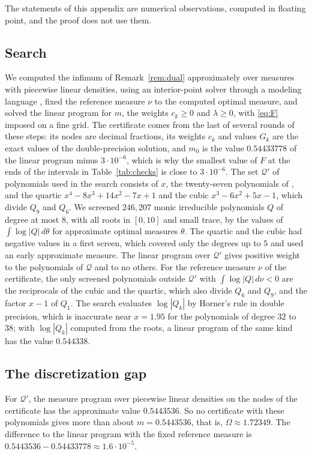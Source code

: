 \documentclass[11pt]{amsart}
\theoremstyle{remark}
\numberwithin{equation}{section}
\newcommand{\Margin}{3\cdot10^{-6}}
\newcommand{\MDual}{0.54433778}
\newcommand{\PrimalVal}{0.5443536}
\begin{document}
The statements of this appendix are numerical observations, computed in floating point, and the proof does not use them.

\subsection{Search}\label{sec:search}
We computed the infimum of Remark~\ref{rem:dual} approximately over measures with piecewise linear densities, using an interior-point solver \cite{Clarabel} through a modeling language \cite{CVXPY}, fixed the reference measure $\nu$ to the computed optimal measure, and solved the linear program for $m$, the weights $c_k\ge0$ and $\lambda\ge0$, with \eqref{eq:F} imposed on a fine grid. The certificate comes from the last of several rounds of these steps: its nodes are decimal fractions, its weights $c_k$ and values $G_k$ are the exact values of the double-precision solution, and $m_0$ is the value $\MDual$ of the linear program minus $\Margin$, which is why the smallest value of $F$ at the ends of the intervals in Table~\ref{tab:checks} is close to $3\cdot10^{-6}$. The set $\mathcal Q'$ of polynomials used in the search consists of $x$, the twenty-seven polynomials of \cite[Table~1]{Fla15}, and the quartic $x^4-8x^3+14x^2-7x+1$ and the cubic $x^3-6x^2+5x-1$, which divide $Q_9$ and $Q_6$. We screened $246{,}207$ monic irreducible polynomials $Q$ of degree at most $8$, with all roots in $[0,10]$ and small trace, by the values of $\int\log|Q|\,d\theta$ for approximate optimal measures $\theta$. The quartic and the cubic had negative values in a first screen, which covered only the degrees up to $5$ and used an early approximate measure. The linear program over $\mathcal Q'$ gives positive weight to the polynomials of $\mathcal Q$ and to no others. For the reference measure $\nu$ of the certificate, the only screened polynomials outside $\mathcal Q'$ with $\int\log|Q|\,d\nu<0$ are the reciprocals of the cubic and the quartic, which also divide $Q_6$ and $Q_9$, and the factor $x-1$ of $Q_1$. The search evaluates $\log|Q_k|$ by Horner's rule in double precision, which is inaccurate near $x=1.95$ for the polynomials of degree $32$ to $38$; with $\log|Q_k|$ computed from the roots, a linear program of the same kind has the value $0.544338$.

\subsection{The discretization gap}\label{sec:gap}
For $\mathcal Q'$, the measure program over piecewise linear densities on the nodes of the certificate has the approximate value $\PrimalVal$. So no certificate with these polynomials gives more than about $m=\PrimalVal$, that is, $\Omega\approx1.72349$. The difference to the linear program with the fixed reference measure is $\PrimalVal-\MDual\approx1.6\cdot10^{-5}$.
\end{document}
